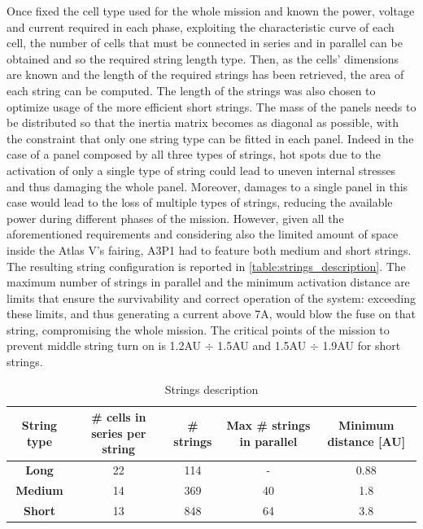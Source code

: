  Once fixed the cell type used for the whole mission and known the power, voltage and current required in each phase, exploiting the characteristic curve of each cell, the number of cells that must be connected in series and in parallel can be obtained and so the required string length type. Then, as the cells' dimensions are known and the length of the required strings has been retrieved, the area of each string can be computed. The length of the strings was also chosen to optimize usage of the more efficient short strings. The mass of the panels needs to be distributed so that the inertia matrix becomes as diagonal as possible, with the constraint that only one string type can be fitted in each panel.\cite{solar_panels_coef} Indeed in the case of a panel composed by all three types of strings, hot spots due to the activation of only a single type of string could lead to uneven internal stresses and thus damaging the whole panel. Moreover, damages to a single panel in this case would lead to the loss of multiple types of strings, reducing the available power during different phases of the mission.  However, given all the aforementioned requirements and considering also the limited amount of space inside the Atlas V's fairing, A3P1 had to feature both medium and short strings.\cite{solar_panels_coef} The resulting string configuration is reported in \autoref{table:strings_description}. The maximum number of strings in parallel and the minimum activation distance are limits that ensure the survivability and correct operation of the system: exceeding these limits, and thus generating a current above 7A, would blow the fuse on that string, compromising the whole mission. The critical points of the mission to prevent middle string turn on is 1.2AU $\div$ 1.5AU and 1.5AU $\div$ 1.9AU for short strings.\cite{solar_panels_coef}

 \begin{table}[H]
    \renewcommand{\arraystretch}{1.3}
    \centering
    \small
\begin{tabular}{|c|c|c|c|c|}
    \hline
    \textbf{String type} & \textbf{\# cells in series per string} & \textbf{\# strings} & \textbf{Max \# strings in parallel} & \textbf{Minimum distance [AU]}\\
    \hline
    \hline
    \textbf{Long}    &  22 & 114 & - & 0.88 \\
    \hline
    \textbf{Medium}  &  14 & 369 & 40 & 1.8\\
    \hline
    \textbf{Short}   &  13 & 848 & 64 & 3.8 \\
    \hline
\end{tabular}
\caption{Strings description}
\label{table:strings_description}
\end{table}

